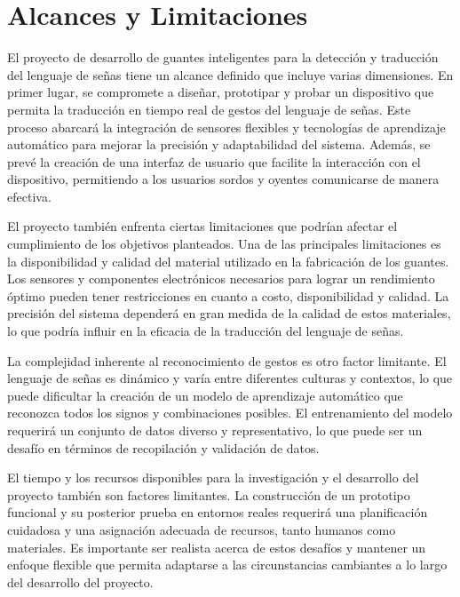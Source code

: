 \section{Alcances y Limitaciones}

El proyecto de desarrollo de guantes inteligentes para la detección y traducción del lenguaje de señas tiene un alcance definido que incluye varias dimensiones. En primer lugar, se compromete a diseñar, prototipar y probar un dispositivo que permita la traducción en tiempo real de gestos del lenguaje de señas. Este proceso abarcará la integración de sensores flexibles y tecnologías de aprendizaje automático para mejorar la precisión y adaptabilidad del sistema. Además, se prevé la creación de una interfaz de usuario que facilite la interacción con el dispositivo, permitiendo a los usuarios sordos y oyentes comunicarse de manera efectiva.

El proyecto también enfrenta ciertas limitaciones que podrían afectar el cumplimiento de los objetivos planteados. Una de las principales limitaciones es la disponibilidad y calidad del material utilizado en la fabricación de los guantes. Los sensores y componentes electrónicos necesarios para lograr un rendimiento óptimo pueden tener restricciones en cuanto a costo, disponibilidad y calidad. La precisión del sistema dependerá en gran medida de la calidad de estos materiales, lo que podría influir en la eficacia de la traducción del lenguaje de señas.

La complejidad inherente al reconocimiento de gestos es otro factor limitante. El lenguaje de señas es dinámico y varía entre diferentes culturas y contextos, lo que puede dificultar la creación de un modelo de aprendizaje automático que reconozca todos los signos y combinaciones posibles. El entrenamiento del modelo requerirá un conjunto de datos diverso y representativo, lo que puede ser un desafío en términos de recopilación y validación de datos.

El tiempo y los recursos disponibles para la investigación y el desarrollo del proyecto también son factores limitantes. La construcción de un prototipo funcional y su posterior prueba en entornos reales requerirá una planificación cuidadosa y una asignación adecuada de recursos, tanto humanos como materiales. Es importante ser realista acerca de estos desafíos y mantener un enfoque flexible que permita adaptarse a las circunstancias cambiantes a lo largo del desarrollo del proyecto.
